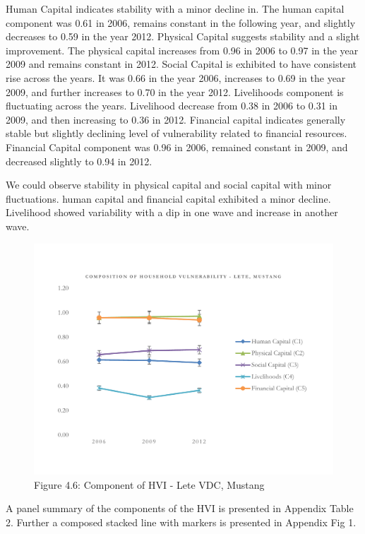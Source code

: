 Human Capital indicates stability with a minor decline in. The human capital component was 0.61 in 2006, remains constant in the following year, and slightly decreases to 0.59 in the year 2012. Physical Capital suggests stability and a slight improvement. The physical capital increases from 0.96 in 2006 to 0.97 in the year 2009 and remains constant in 2012. Social Capital is exhibited to have consistent rise across the years. It was 0.66 in the year 2006, increases to 0.69 in the year 2009, and further increases to 0.70 in the year 2012. Livelihoods component is fluctuating across the years. Livelihood decrease from 0.38 in 2006 to 0.31 in 2009, and then increasing to 0.36 in 2012. Financial capital indicates generally stable but slightly declining level of vulnerability related to financial resources. Financial Capital component was 0.96 in 2006, remained constant in 2009, and decreased slightly to 0.94 in 2012. 

We could observe stability in physical capital and social capital with minor fluctuations. human capital and financial capital exhibited a minor decline. Livelihood showed variability with a dip in one wave and increase in another wave. 

\begin{figure}[H]
	\includegraphics[scale=0.6]{Graphs and figures/HVI_Component_Lete_line.pdf}
	\captionsetup{labelformat=empty}
	\caption{Figure 4.6: Component of HVI - Lete VDC, Mustang}
	\setlength{\abovecaptionskip}{1pt}
	\label{fig:hviletecomponents}
\end{figure}

A panel summary of the components of the HVI is presented in Appendix Table 2. Further a composed stacked line with markers is presented in Appendix Fig 1.

